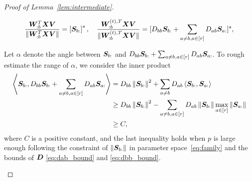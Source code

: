 \documentclass[lettersize,journal]{IEEEtran}
\theoremstyle{definition}
\theoremstyle{definition}
\newcommand{\off}[1]{\left[#1\right]}
\newcommand{\offf}[1]{\left\{#1\right\}}
\newcommand{\ang}[1]{\left\langle#1\right\rangle}
\begin{document}
\begin{proof}[Proof of Lemma~\ref{lem:intermediate}]
\begin{enumerate}
    \begin{equation}
        \frac{ \mW_{:b}^T \mX \mV  }{\onormSize{}{  \mW_{:b}^T \mX \mV }} = \off{\mS_{b:}}^s, \quad \frac{ \mW_{:b}^{(t), T} \mX \mV  }{ \onormSize{}{\mW_{:b}^{(t), T} \mX \mV }} = [D_{bb} \mS_{b:} + \sum_{a \neq b, a \in [r]} D_{ab} \mS_{a:}]^s, 
    \end{equation}
    
    Let $\alpha$ denote the angle between $\bm S_{b:}$ and $D_{bb} \bm S_{b:} + \sum_{a \neq b, a \in [r]} D_{ab} \bm S_{a:}$. To rough estimate the range of $\alpha$, we consider the inner product 
    \begin{align}
        \ang{\mS_{b:},  D_{bb} \mS_{b:} + \sum_{a \neq b, a \in [r]} D_{ab} \mS_{a:}}  &= D_{bb} \onorm{\mS_{b:}}^2 + \sum_{a \neq b} D_{ab}\ang{\mS_{b:}, \mS_{a:}}\\
        &\geq D_{bb} \onorm{\mS_{b:}}^2 -  \sum_{a \neq b, a \in [r]} D_{ab}   \onorm{\mS_{b:}} \max_{a \in [r]}  \onorm{\mS_{a:}} \\
        & \geq C,
    \end{align}
    where $C$ is a positive constant, and the last inequality holds when $p$ is large enough following the constraint of $\left\lVert\bm S_{b:}\right\rVert$ in parameter space~\eqref{eq:family} and the bounds of $\bm{D}$ \eqref{eq:dab_bound} and \eqref{eq:dbb_bound}.
    

\end{enumerate}
\end{proof}
\end{document}
